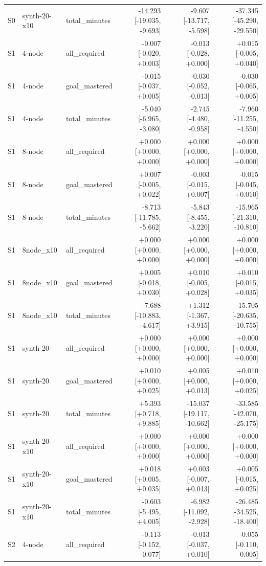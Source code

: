 \begin{table}[htbp]
\begin{tabular}{lllrrr}
S0 & synth-20-x10 & total\_minutes & -14.293 [-19.035, -9.693] & -9.607 [-13.717, -5.598] & -37.345 [-45.290, -29.550] \\
S1 & 4-node & all\_required & -0.007 [-0.020, +0.003] & -0.013 [-0.028, +0.000] & +0.015 [-0.005, +0.040] \\
S1 & 4-node & goal\_mastered & -0.015 [-0.037, +0.005] & -0.030 [-0.052, -0.013] & -0.030 [-0.065, +0.005] \\
S1 & 4-node & total\_minutes & -5.040 [-6.965, -3.080] & -2.745 [-4.480, -0.958] & -7.960 [-11.255, -4.550] \\
S1 & 8-node & all\_required & +0.000 [+0.000, +0.000] & +0.000 [+0.000, +0.000] & +0.000 [+0.000, +0.000] \\
S1 & 8-node & goal\_mastered & +0.007 [-0.005, +0.022] & -0.003 [-0.015, +0.007] & -0.015 [-0.045, +0.010] \\
S1 & 8-node & total\_minutes & -8.713 [-11.785, -5.662] & -5.843 [-8.455, -3.220] & -15.965 [-21.310, -10.810] \\
S1 & 8node\_x10 & all\_required & +0.000 [+0.000, +0.000] & +0.000 [+0.000, +0.000] & +0.000 [+0.000, +0.000] \\
S1 & 8node\_x10 & goal\_mastered & +0.005 [-0.018, +0.030] & +0.010 [-0.005, +0.028] & +0.010 [-0.015, +0.035] \\
S1 & 8node\_x10 & total\_minutes & -7.688 [-10.883, -4.617] & +1.312 [-1.367, +3.915] & -15.705 [-20.635, -10.755] \\
S1 & synth-20 & all\_required & +0.000 [+0.000, +0.000] & +0.000 [+0.000, +0.000] & +0.000 [+0.000, +0.000] \\
S1 & synth-20 & goal\_mastered & +0.010 [+0.000, +0.025] & +0.005 [+0.000, +0.013] & +0.010 [+0.000, +0.025] \\
S1 & synth-20 & total\_minutes & +5.393 [+0.718, +9.885] & -15.037 [-19.117, -10.662] & -33.585 [-42.070, -25.175] \\
S1 & synth-20-x10 & all\_required & +0.000 [+0.000, +0.000] & +0.000 [+0.000, +0.000] & +0.000 [+0.000, +0.000] \\
S1 & synth-20-x10 & goal\_mastered & +0.018 [+0.005, +0.035] & +0.003 [-0.007, +0.013] & +0.005 [-0.015, +0.025] \\
S1 & synth-20-x10 & total\_minutes & -0.603 [-5.495, +4.005] & -6.982 [-11.092, -2.928] & -26.485 [-34.525, -18.400] \\
S2 & 4-node & all\_required & -0.113 [-0.152, -0.077] & -0.013 [-0.037, +0.010] & -0.055 [-0.110, -0.005] \\

\end{tabular}
\end{table}
